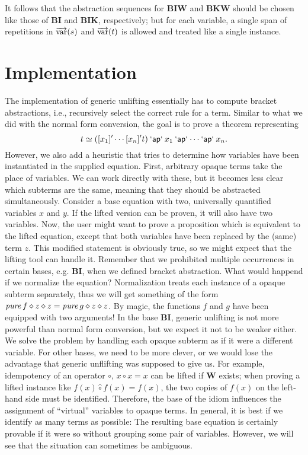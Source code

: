 It follows that the abstraction sequences for $\mathbf{BIW}$ and $\mathbf{BKW}$
should be chosen like those of $\mathbf{BI}$ and $\mathbf{BIK}$, respectively;
but for each variable, a single span of repetitions in $\overrightarrow{\operatorname{var}}(s)$ and
$\overrightarrow{\operatorname{var}}(t)$ is allowed and treated like a single instance.

\section{Implementation}\label{subsec:combinator-implementation}

The implementation of generic unlifting essentially has to compute bracket
abstractions, i.e., recursively select the correct rule for a term.
Similar to what we did with the normal form conversion, the goal is to prove a
theorem representing
\[ t \simeq ([x_1]'\cdots[x_n]'t) \mathbin{\mathsf{`ap`}} x_1 \mathbin{\mathsf{`ap`}} \cdots \mathbin{\mathsf{`ap`}} x_n. \]
However, we also add a heuristic that tries to determine how variables have
been instantiated in the supplied equation.
First, arbitrary opaque terms take the place of variables.
We can work directly with these, but it becomes less clear which subterms are
the same, meaning that they should be abstracted simultaneously.
Consider a base equation with two, universally quantified variables $x$ and $y$.
If the lifted version can be proven, it will also have two variables.
Now, the user might want to prove a proposition which is equivalent to the
lifted equation, except that both variables have been replaced by the
(same) term $z$.
This modified statement is obviously true, so we might expect that the lifting
tool can handle it.
Remember that we prohibited multiple occurrences in certain bases, e.g.
$\mathbf{BI}$, when we defined bracket abstraction.
What would happend if we normalize the equation?
Normalization treats each instance of a opaque subterm separately, thus we will
get something of the form $\operatorname{\mathit{pure}} f \diamond z \diamond z = \operatorname{\mathit{pure}} g \diamond z \diamond z$.
By magic, the functions $f$ and $g$ have been equipped with two arguments!
In the base $\mathbf{BI}$, generic unlifting is not more powerful than
normal form conversion, but we expect it not to be weaker either.
We solve the problem by handling each opaque subterm as if it were a different
variable.
For other bases, we need to be more clever, or we would lose the advantage
that generic unflifting was supposed to give us.
For example, idempotency of an operator $\circ$, $x \circ x = x$
can be lifted if $\mathbf{W}$ exists;
when proving a lifted instance like $f(x) \hat\circ f(x) = f(x)$, the two
copies of $f(x)$ on the left-hand side must be identified.
Therefore, the base of the idiom influences the assignment of ``virtual''
variables to opaque terms.
In general, it is best if we identify as many terms as possible:
The resulting base equation is certainly provable if it were so without grouping
some pair of variables.
However, we will see that the situation can sometimes be ambiguous.

